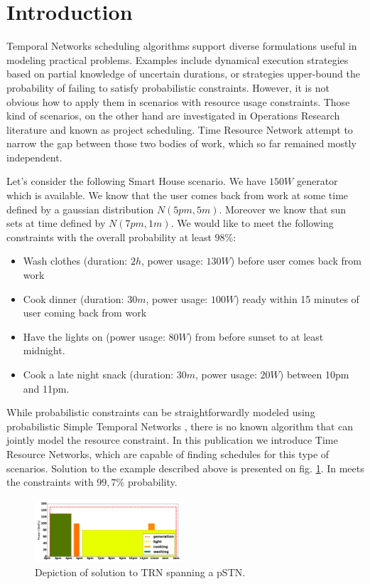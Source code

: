 \section{Introduction}
Temporal Networks scheduling algorithms support diverse formulations useful in modeling practical problems. Examples include dynamical execution strategies based on partial knowledge of uncertain durations, or strategies upper-bound the probability of failing to satisfy probabilistic constraints. However, it is not obvious how to apply them in scenarios with resource usage constraints. Those kind of scenarios, on the other hand are investigated in Operations Research literature and known as project scheduling. Time Resource Network attempt to narrow the gap between those two bodies of work, which so far remained mostly independent.

Let's consider the following Smart House scenario. We have $150W$ generator which is available. We know that the user comes back from work at some time defined by a gaussian distribution $N(5pm, 5m)$. Moreover we know that sun sets at time defined by $N(7pm, 1m)$. We would like to meet the following constraints with the overall probability at least $98\%$:
\begin{itemize}
\setlength\itemsep{0.00em}

\item Wash clothes (duration: $2h$, power usage: $130W$) before user comes back from work
\item Cook dinner (duration: $30m$, power usage: $100W$) ready within 15 minutes of user coming back from work
\item Have the lights on (power usage: $80W$) from before sunset to at least midnight.
\item Cook a late night snack (duration: $30m$, power usage: $20W$) between 10pm and 11pm.
\end{itemize}
While probabilistic constraints can be straightforwardly modeled using probabilistic Simple Temporal Networks \cite{Fang2014}, there is no known algorithm that can jointly model the resource constraint. In this publication we introduce Time Resource Networks, which are capable of finding schedules for this type of scenarios. Solution to the example described above is presented on fig. \ref{fig:pstnu_scheduling}. In meets the constraints with $99,7\%$ probability.


\begin{figure}[H]
\begin{center}
\includegraphics[width=0.49\textwidth]{pstnu_scheduling}
\caption{Depiction of solution to TRN spanning a pSTN.}
\label{fig:pstnu_scheduling}
\end{center}
\end{figure}
